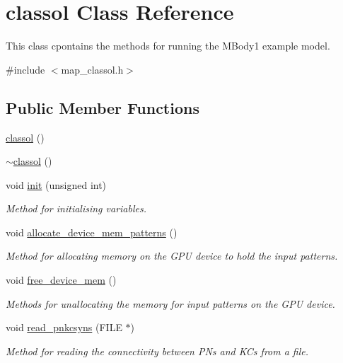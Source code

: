 \hypertarget{classclassol}{\section{classol Class Reference}
\label{classclassol}
}


This class cpontains the methods for running the M\+Body1 example model.  




{\ttfamily \#include $<$map\+\_\+classol.\+h$>$}

\subsection*{Public Member Functions}
\begin{DoxyCompactItemize}
\item 
\hyperlink{classclassol_a0f4a2bbdd48bcdfcc2abaa58a839232c}{classol} ()
\item 
\hyperlink{classclassol_a1273a6a57e2127a7b028bdbd92fed9b4}{$\sim$classol} ()
\item 
void \hyperlink{classclassol_ae1d319555e41d814ef2f8407418df8dc}{init} (unsigned int)
\begin{DoxyCompactList}\small\item\em Method for initialising variables. \end{DoxyCompactList}\item 
void \hyperlink{classclassol_a224bf755bd74d7512606518ae2658215}{allocate\+\_\+device\+\_\+mem\+\_\+patterns} ()
\begin{DoxyCompactList}\small\item\em Method for allocating memory on the G\+P\+U device to hold the input patterns. \end{DoxyCompactList}\item 
void \hyperlink{classclassol_ade653847f5de20fe2f944260d532ddf9}{free\+\_\+device\+\_\+mem} ()
\begin{DoxyCompactList}\small\item\em Methods for unallocating the memory for input patterns on the G\+P\+U device. \end{DoxyCompactList}\item 
void \hyperlink{classclassol_a1529539e9d2424d56016ad8e60aa0b79}{read\+\_\+pnkcsyns} (F\+I\+L\+E $\ast$)
\begin{DoxyCompactList}\small\item\em Method for reading the connectivity between P\+Ns and K\+Cs from a file. \end{DoxyCompactList}\item 

\end{DoxyCompactItemize}
